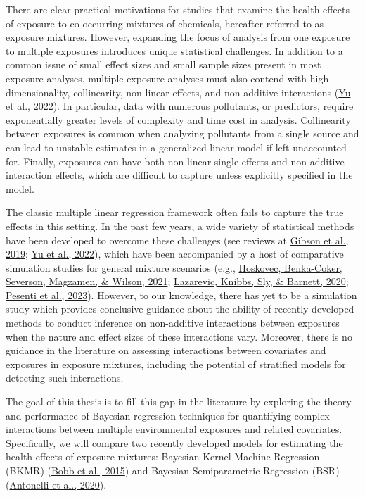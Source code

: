 \documentclass[12pt, twoside]{amherstthesis}
\begin{document}
There are clear practical motivations for studies that examine the health effects of exposure to co-occurring mixtures of chemicals, hereafter referred to as exposure mixtures. However, expanding the focus of analysis from one exposure to multiple exposures introduces unique statistical challenges. In addition to a common issue of small effect sizes and small sample sizes present in most exposure analyses, multiple exposure analyses must also contend with high-dimensionality, collinearity, non-linear effects, and non-additive interactions (\protect\hyperlink{ref-yu_review_2022}{Yu et al., 2022}). In particular, data with numerous pollutants, or predictors, require exponentially greater levels of complexity and time cost in analysis. Collinearity between exposures is common when analyzing pollutants from a single source and can lead to unstable estimates in a generalized linear model if left unaccounted for. Finally, exposures can have both non-linear single effects and non-additive interaction effects, which are difficult to capture unless explicitly specified in the model.

The classic multiple linear regression framework often fails to capture the true effects in this setting. In the past few years, a wide variety of statistical methods have been developed to overcome these challenges (see reviews at \protect\hyperlink{ref-gibson_overview_2019}{Gibson et al., 2019}; \protect\hyperlink{ref-yu_review_2022}{Yu et al., 2022}), which have been accompanied by a host of comparative simulation studies for general mixture scenarios (e.g., \protect\hyperlink{ref-hoskovec_model_2021}{Hoskovec, Benka-Coker, Severson, Magzamen, \& Wilson, 2021}; \protect\hyperlink{ref-lazarevic_performance_2020}{Lazarevic, Knibbs, Sly, \& Barnett, 2020}; \protect\hyperlink{ref-pesenti_comparative_2023}{Pesenti et al., 2023}). However, to our knowledge, there has yet to be a simulation study which provides conclusive guidance about the ability of recently developed methods to conduct inference on non-additive interactions between exposures when the nature and effect sizes of these interactions vary. Moreover, there is no guidance in the literature on assessing interactions between covariates and exposures in exposure mixtures, including the potential of stratified models for detecting such interactions.

The goal of this thesis is to fill this gap in the literature by exploring the theory and performance of Bayesian regression techniques for quantifying complex interactions between multiple environmental exposures and related covariates. Specifically, we will compare two recently developed models for estimating the health effects of exposure mixtures: Bayesian Kernel Machine Regression (BKMR) (\protect\hyperlink{ref-bobb_bayesian_2015}{Bobb et al., 2015}) and Bayesian Semiparametric Regression (BSR) (\protect\hyperlink{ref-antonelli_estimating_2020}{Antonelli et al., 2020}).
\end{document}
